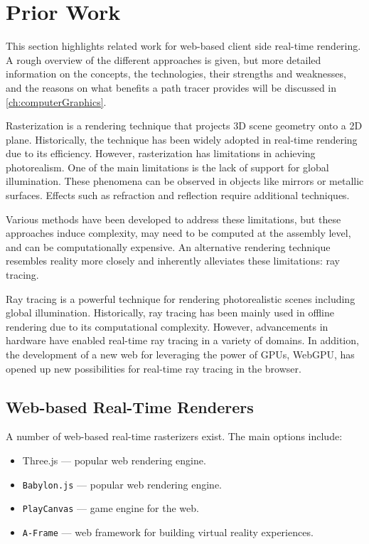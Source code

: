 \section{Prior Work}

This section highlights related work for web-based client side real-time rendering. A rough overview of the different approaches is given, but more detailed information on the concepts, the technologies, their strengths and weaknesses, and the reasons on what benefits a path tracer provides will be discussed in \autoref{ch:computerGraphics}.

Rasterization is a rendering technique that projects 3D scene geometry onto a 2D plane. Historically, the technique has been widely adopted in real-time rendering due to its efficiency. However, rasterization has limitations in achieving photorealism. One of the main limitations is the lack of support for global illumination. These phenomena can be observed in objects like mirrors or metallic surfaces. Effects such as refraction and reflection require additional techniques.

Various methods have been developed to address these limitations, but these approaches induce complexity, may need to be computed at the assembly level, and can be computationally expensive. An alternative rendering technique resembles reality more closely and inherently alleviates these limitations: ray tracing.

Ray tracing is a powerful technique for rendering photorealistic scenes including global illumination. Historically, ray tracing has been mainly used in offline rendering due to its computational complexity. However, advancements in hardware have enabled real-time ray tracing in a variety of domains. In addition, the development of a new web  for leveraging the power of \glspl{GPU}, WebGPU, has opened up new possibilities for real-time ray tracing in the browser.

\subsection*{Web-based Real-Time Renderers}

A number of web-based real-time rasterizers exist. The main options include:

\begin{itemize}
  \item {\gls{Three.js}} \cite{threeJSWebsite} — popular web rendering engine.
  \item {\texttt{Babylon.js}} \cite{babylonJSWebsite} — popular web rendering engine.
  \item {\texttt{PlayCanvas}} \cite{playCanvasWebsite} — game engine for the web.
  \item {\texttt{A-Frame}} \cite{aFrameWebsite} — web framework for building virtual reality experiences.
\end{itemize}

